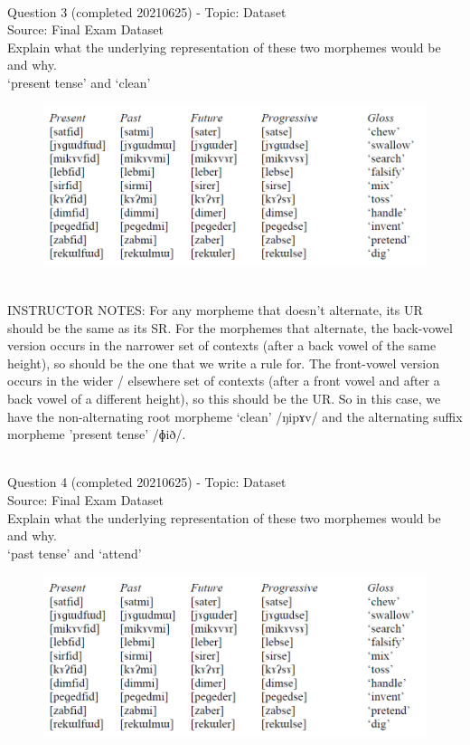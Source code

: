 \documentclass[12pt]{article}
\begin{document}
~\\

{\large Question 3} (completed 20210625) - Topic: Dataset\\
Source: Final Exam Dataset\\

Explain what the underlying representation of these two morphemes would be and why.\\

`present tense' and `clean'

\begin{figure}[H]
\includegraphics{../images/final_dataset.png}
\end{figure}

~\\
INSTRUCTOR NOTES: For any morpheme that doesn’t alternate, its UR should be the same as its SR.  For the morphemes that alternate, the back-vowel version occurs in the narrower set of contexts (after a back vowel of the same height), so should be the one that we write a rule for. The front-vowel version occurs in the wider / elsewhere set of contexts (after a front vowel and after a back vowel of a different height), so this should be the UR. So in this case, we have the non-alternating root morpheme ‘clean’ /ŋipɤv/ and the alternating suffix morpheme 'present tense' /ɸið/.


~\\

{\large Question 4} (completed 20210625) - Topic: Dataset\\
Source: Final Exam Dataset\\

Explain what the underlying representation of these two morphemes would be and why.\\

`past tense' and `attend'

\begin{figure}[H]
\includegraphics{../images/final_dataset.png}
\end{figure}
\end{document}
